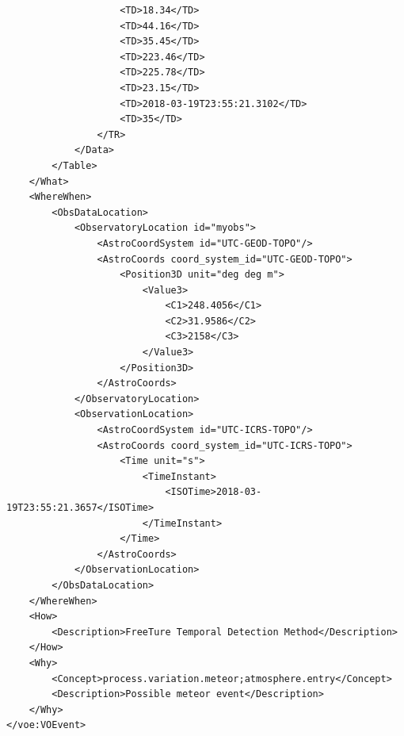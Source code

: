 \documentclass[referee,a4paper,12pt,traditabstract]{swsc}
\begin{document}
\begin{linenumbers}
{\begin{verbatim}
                    <TD>18.34</TD>
                    <TD>44.16</TD>
                    <TD>35.45</TD>
                    <TD>223.46</TD>
                    <TD>225.78</TD>
                    <TD>23.15</TD>
                    <TD>2018-03-19T23:55:21.3102</TD>
                    <TD>35</TD>
                </TR>
            </Data>
        </Table>
    </What>
    <WhereWhen>
        <ObsDataLocation>
            <ObservatoryLocation id="myobs">
                <AstroCoordSystem id="UTC-GEOD-TOPO"/>
                <AstroCoords coord_system_id="UTC-GEOD-TOPO">
                    <Position3D unit="deg deg m">
                        <Value3>
                            <C1>248.4056</C1>
                            <C2>31.9586</C2>
                            <C3>2158</C3>
                        </Value3>
                    </Position3D>
                </AstroCoords>
            </ObservatoryLocation>
            <ObservationLocation>
                <AstroCoordSystem id="UTC-ICRS-TOPO"/>
                <AstroCoords coord_system_id="UTC-ICRS-TOPO">
                    <Time unit="s">
                        <TimeInstant>
                            <ISOTime>2018-03-19T23:55:21.3657</ISOTime>
                        </TimeInstant>
                    </Time>
                </AstroCoords>
            </ObservationLocation>
        </ObsDataLocation>
    </WhereWhen>
    <How>
        <Description>FreeTure Temporal Detection Method</Description>
    </How>
    <Why>
        <Concept>process.variation.meteor;atmosphere.entry</Concept>
        <Description>Possible meteor event</Description>
    </Why>
</voe:VOEvent>
\end{verbatim}
}

\end{linenumbers}
\end{document}
